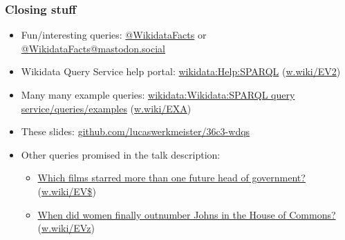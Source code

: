 \documentclass[aspectratio=169]{beamer}
\makeatletter
\newcommand{\Twitter}[1]{\href{https://twitter.com/#1}{@#1}}
\newcommand{\Mastodon}[2]{\href{https://#2/@#1}{@#1@#2}}
\newcommand{\wwiki}[1]{\href{https://w.wiki/#1}{w.wiki/#1}}
\makeatother
\begin{document}
\begin{frame}
  \frametitle{Closing stuff}
  \begin{itemize}
  \item Fun/interesting queries: \Twitter{WikidataFacts} or \Mastodon{WikidataFacts}{mastodon.social}
  \item Wikidata Query Service help portal: \href{https://www.wikidata.org/wiki/Special:MyLanguage/Wikidata:SPARQL_query_service/Wikidata_Query_Help}{wikidata:Help:SPARQL} (\wwiki{EV2})
  \item Many many example queries: \href{https://www.wikidata.org/wiki/Wikidata:SPARQL_query_service/queries/examples}{wikidata:Wikidata:SPARQL query service/queries/examples} (\wwiki{EXA})
  \item These slides: \href{https://github.com/lucaswerkmeister/36c3-wdqs}{github.com/lucaswerkmeister/36c3-wdqs}
  \item Other queries promised in the talk description:
    \begin{itemize}
    \item \href{https://www.wikidata.org/wiki/User:TweetsFactsAndQueries/Queries/films_starring_more_than_one_future_head_of_government}{Which films starred more than one future head of government?} (\wwiki{EV\$})
    \item \href{https://www.wikidata.org/wiki/User:TweetsFactsAndQueries/Queries/UK_parliaments_with_count_of_Johns_and_count_of_women}{When did women finally outnumber Johns in the House of Commons?} (\wwiki{EVz})
    \end{itemize}
  \end{itemize}
\end{frame}
\end{document}
